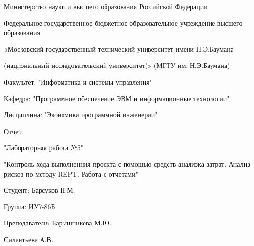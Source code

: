 \begin{center}
	Министерство науки и высшего образования Российской Федерации
	
	
	Федеральное государственное бюджетное образовательное учреждение высшего образования
	
	
	«Московский государственный технический университет имени Н.Э.Баумана
	
	
	(национальный исследовательский университет)» (МГТУ им. Н.Э.Баумана)
\end{center}

\vspace{8ex}

\begin{flushleft}
	Факультет: "Информатика и системы управления"
	
	Кафедра: "Программное обеспечение ЭВМ и информационные технологии"
	
	Дисциплина: "Экономика программной инженерии"
\end{flushleft}
\vspace{5ex}
\begin{center}
	Отчет
	
	"Лабораторная работа №5"
	
	"Контроль хода выполненния проекта с помощью средств анализка затрат. Анализ рисков по методу REPT. Работа с отчетами"
\end{center}

\vspace{5ex}

\begin{flushright}
	Студент: Барсуков Н.М.
	
	Группа: ИУ7-86Б
	
	Преподаватели: Барышникова М.Ю. 
	
	Силантьева А.В.
\end{flushright}